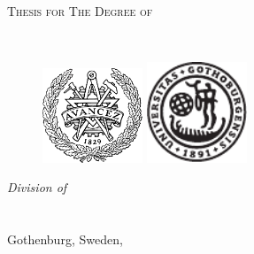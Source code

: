 
\thispagestyle{empty} %
\begin{center}
  \textsc{Thesis for The Degree of \degreetitle}\\
\end{center}

\vfill

\begin{center} \huge \textbf{\mytitle}
\end{center}

\vspace{1.2cm}
\begin{center}
\textsc{\authorname} \\
\end{center}

\vspace{1.4cm}
\begin{figure}[h]
  \begin{center}
     \includegraphics[width=30mm]{Fig/Avancez50PC.pdf}
     \hspace{1cm}
     \includegraphics[width=30mm]{Fig/GU_nu.pdf}
  \end{center}
\end{figure}
\vspace{1.6cm}

\begin{center}
\textit{Division of \division} \\
\textit{\mydepartment}\\
\textsc{\chalIgu}\\
Gothenburg, Sweden, \currentyear \\
\end{center}

